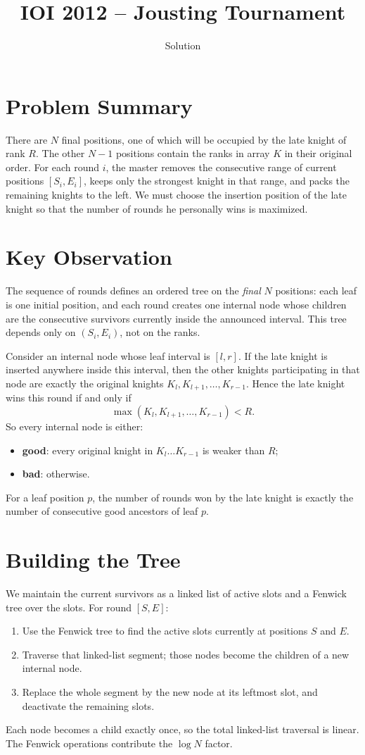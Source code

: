 \documentclass[11pt,a4paper]{article}
\title{IOI 2012 -- Jousting Tournament}
\author{Solution}
\date{}
\begin{document}
\maketitle

\section{Problem Summary}
There are $N$ final positions, one of which will be occupied by the late knight of rank $R$.
The other $N-1$ positions contain the ranks in array $K$ in their original order.
For each round $i$, the master removes the consecutive range of current positions
$[S_i, E_i]$, keeps only the strongest knight in that range, and packs the remaining
knights to the left.
We must choose the insertion position of the late knight so that the number of rounds he
personally wins is maximized.

\section{Key Observation}
The sequence of rounds defines an ordered tree on the \emph{final} $N$ positions:
each leaf is one initial position, and each round creates one internal node whose children
are the consecutive survivors currently inside the announced interval.
This tree depends only on $(S_i, E_i)$, not on the ranks.

Consider an internal node whose leaf interval is $[l, r]$.
If the late knight is inserted anywhere inside this interval, then the other knights
participating in that node are exactly the original knights
$K_l, K_{l+1}, \dots, K_{r-1}$.
Hence the late knight wins this round if and only if
\[
\max(K_l, K_{l+1}, \dots, K_{r-1}) < R.
\]
So every internal node is either:
\begin{itemize}
  \item \textbf{good}: every original knight in $K_l \dots K_{r-1}$ is weaker than $R$;
  \item \textbf{bad}: otherwise.
\end{itemize}
For a leaf position $p$, the number of rounds won by the late knight is exactly the number
of consecutive good ancestors of leaf $p$.

\section{Building the Tree}
We maintain the current survivors as a linked list of active slots and a Fenwick tree over
the slots. For round $[S,E]$:
\begin{enumerate}
  \item Use the Fenwick tree to find the active slots currently at positions $S$ and $E$.
  \item Traverse that linked-list segment; those nodes become the children of a new internal node.
  \item Replace the whole segment by the new node at its leftmost slot, and deactivate the
        remaining slots.
\end{enumerate}
Each node becomes a child exactly once, so the total linked-list traversal is linear.
The Fenwick operations contribute the $\log N$ factor.
\end{document}
